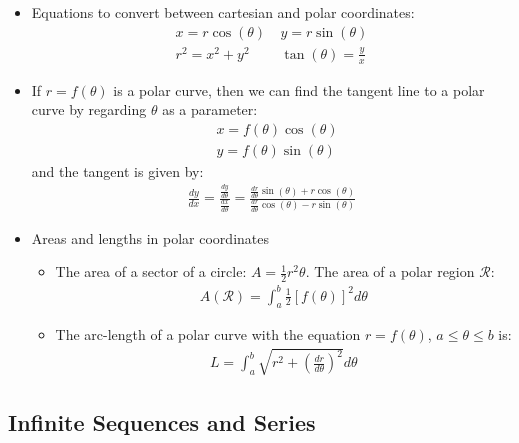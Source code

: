 \documentclass[reqno,11pt]{amsart}
\theoremstyle{definition}
\theoremstyle{remark}
\begin{document}
\begin{itemize}
\begin{itemize}[noitemsep]
	\end{itemize}
	\item Equations to convert between cartesian and polar coordinates: 
	\begin{align}
		x = r \cos (\theta)\ & y = r \sin (\theta) \\
		r^2 = x^2 + y^2\ & \tan ( \theta) = \frac{y}{x}	
	\end{align}
	\item If $r = f(\theta)$ is a polar curve, then we can find the tangent line to a polar curve by regarding $\theta$ as a parameter: 
	\begin{align*}
			& x = f(\theta) \cos ( \theta) \\
			& y = f(\theta) \sin ( \theta) 
	\end{align*}
	and the tangent is given by: 
	\begin{align}
		\frac{dy}{dx} = \frac{\frac{dy}{d \theta}}{\frac{dx}{d \theta}} = \frac{\frac{dr}{d \theta} \sin (\theta) + r \cos ( \theta)}{\frac{dr}{d \theta} \cos ( \theta) - r \sin (\theta)}
	\end{align}
	\item Areas and lengths in polar coordinates
	\begin{itemize}[noitemsep]
		\item The area of a sector of a circle: $A = \frac{1}{2} r^2 \theta$. The area of a polar region $\mathcal{R}$: 
		\begin{align}
			A(\mathcal{R}) = \int_a^b \frac{1}{2} [ f(\theta) ]^2 d \theta 
		\end{align}
		\item The arc-length of a polar curve with the equation $r = f( \theta)$, $ a \leq \theta \leq b$ is: 
		\begin{align}
			L = \int_a^b \sqrt{r^2 + \left( \frac{dr}{d \theta} \right)^2} d \theta 	
		\end{align}
	\end{itemize}
\end{itemize}

\subsection{Infinite Sequences and Series}
\end{document}
